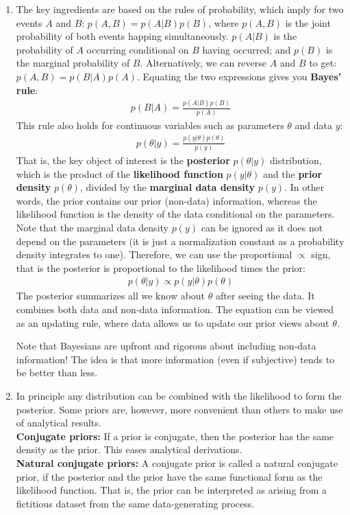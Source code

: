 \begin{enumerate}
\item The key ingredients are based on the rules of probability, which imply for two events \(A\) and \(B\):
\(p(A,B)=p(A|B)p(B)\), where \(p(A,B)\) is the joint probability of both events happing simultaneously.
\(p(A|B)\) is the probability of \(A\) occurring conditional on \(B\) having occurred;
and \(p(B)\) is the marginal probability of \(B\).
Alternatively, we can reverse \(A\) and \(B\) to get: \(p(A,B)=p(B|A)p(A)\).
Equating the two expressions gives you \textbf{Bayes' rule}:
\begin{align*}
p(B|A) = \frac{p(A|B)p(B)}{p(A)}
\end{align*}
This rule also holds for continuous variables such as parameters \(\theta \) and data \(y\):
\begin{align*}
p(\theta|y) = \frac{p(y|\theta)p(\theta)}{p(y)}
\end{align*}
That is, the key object of interest is the \textbf{posterior} \(p(\theta|y)\) distribution,
which is the product of the \textbf{likelihood function} \(p(y|\theta)\) and the \textbf{prior density} \(p(\theta)\),
divided by the \textbf{marginal data density} \(p(y)\).
In other words, the prior contains our prior (non-data) information,
  whereas the likelihood function is the density of the data conditional on the parameters.
Note that the marginal data density \(p(y)\) can be ignored
as it does not depend on the parameters
(it is just a normalization constant as a probability density integrates to one).
Therefore, we can use the proportional \(\propto \) sign, that is the posterior is proportional to the likelihood times the prior:
\begin{align*}
p(\theta|y) \propto p(y|\theta) p(\theta)
\end{align*}
The posterior summarizes all we know about \(\theta \) after seeing the data.
It combines both data and non-data information.
The equation can be viewed as an updating rule,
where data allows us to update our prior views about \(\theta \).
	
Note that Bayesians are upfront and rigorous about including non-data information!
The idea is that more information (even if subjective) tends to be better than less.

\item In principle any distribution can be combined with the likelihood to form the posterior.
Some priors are, however, more convenient than others to make use of analytical results.
\\
\textbf{Conjugate priors:} If a prior is conjugate, then the posterior has the same density as the prior.
This eases analytical derivations.
\\
\textbf{Natural conjugate priors:} A conjugate prior is called a natural conjugate prior,
if the posterior and the prior have the same functional form as the likelihood function.
That is, the prior can be interpreted as arising from a fictitious dataset from the same data-generating process.


\end{enumerate}
